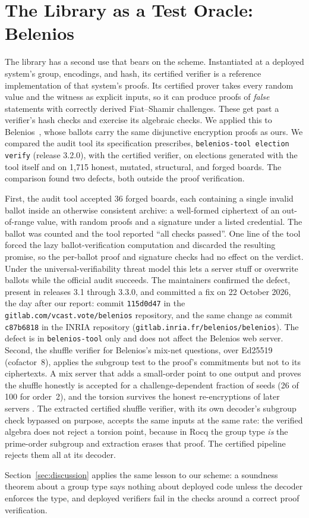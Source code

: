 \section{The Library as a Test Oracle: Belenios}\label{sec:belenios}
The library has a second use that bears on the scheme. Instantiated at a
deployed system's group, encodings, and hash, its certified verifier is a
reference implementation of that system's proofs. Its certified prover
takes every random value and the witness as explicit inputs, so it can
produce proofs of \emph{false} statements with correctly derived
Fiat--Shamir challenges. These get past a verifier's hash checks and
exercise its algebraic checks. We applied this to
Belenios~\cite{belenios2019}, whose ballots carry the same disjunctive
encryption proofs as ours. We compared the audit tool its specification
prescribes, \texttt{belenios-tool election verify} (release 3.2.0), with
the certified verifier, on elections generated with the tool itself and on
1{,}715 honest, mutated, structural, and forged boards. The comparison
found two defects, both outside the proof verification.

First, the audit tool accepted 36 forged boards, each containing a single
invalid ballot inside an otherwise consistent archive: a well-formed
ciphertext of an out-of-range value, with random proofs and a signature
under a listed credential. The ballot was counted and the tool reported
``all checks passed''. One line of the tool forced the lazy
ballot-verification computation and discarded the resulting promise, so
the per-ballot proof and signature checks had no effect on the verdict.
Under the universal-verifiability threat model this lets a server stuff
or overwrite ballots while the official audit succeeds. The maintainers
confirmed the defect, present in releases 3.1 through 3.3.0, and
committed a fix on 22 October 2026, the day after our report: commit
\texttt{115d0d47} in the \texttt{gitlab.com/vcast.vote/belenios}
repository, and the same change as commit \texttt{c87b6818} in the
INRIA repository (\texttt{gitlab.inria.fr/belenios/belenios}). The defect is in \texttt{belenios-tool} only and does
not affect the Belenios web server. Second, the shuffle verifier for
Belenios's mix-net questions, over Ed25519 (cofactor~8), applies the
subgroup test to the proof's commitments but not to its ciphertexts. A
mix server that adds a small-order point to one output and proves the
shuffle honestly is accepted for a challenge-dependent fraction of seeds
(26 of 100 for order~2), and the torsion survives the honest
re-encryptions of later servers . The
extracted certified shuffle verifier, with its own decoder's subgroup
check bypassed on purpose, accepts the same inputs at the same rate: the
verified algebra does not reject a torsion point, because in Rocq the
group type \emph{is} the prime-order subgroup and extraction erases that
proof. The certified pipeline rejects them all at its decoder.

Section~\ref{sec:discussion} applies the same lesson to our scheme: a
soundness theorem about a group type says nothing about deployed code
unless the decoder enforces the type, and deployed verifiers fail in the
checks around a correct proof verification.
